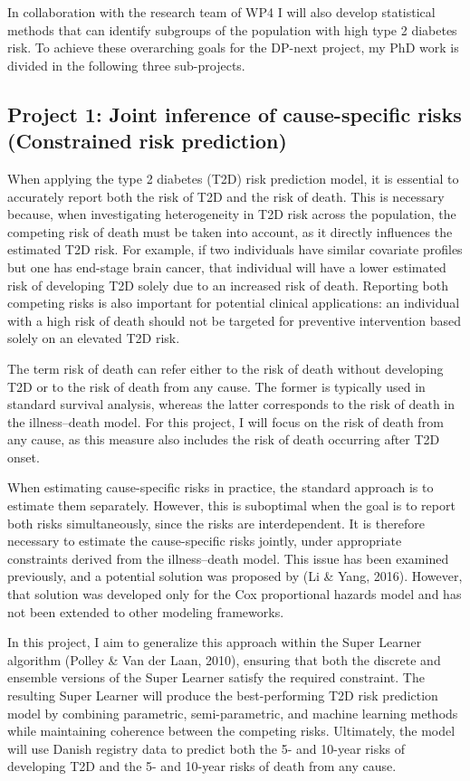 \documentclass{article}
\makeatletter
\newcommand{\citeprocitem}[2]{\hyper@linkstart{cite}{citeproc_bib_item_#1}#2\hyper@linkend}
\makeatother
\begin{document}
In collaboration with the research team of WP4 I will also develop
statistical methods that can identify subgroups of the population with
high type 2 diabetes risk. To achieve these overarching goals for the DP-next
project, my PhD work is divided in the following three sub-projects.


\subsection*{Project 1: Joint inference of cause-specific risks (Constrained risk prediction)}
\label{sec:org53fa25b}
When applying the type 2 diabetes (T2D) risk prediction model, it is essential to accurately report both the risk of T2D and the risk of death. This is necessary because, when investigating heterogeneity in T2D risk across the population, the competing risk of death must be taken into account, as it directly influences the estimated T2D risk. For example, if two individuals have similar covariate profiles but one has end-stage brain cancer, that individual will have a lower estimated risk of developing T2D solely due to an increased risk of death. Reporting both competing risks is also important for potential clinical applications: an individual with a high risk of death should not be targeted for preventive intervention based solely on an elevated T2D risk.

The term risk of death can refer either to the risk of death without developing T2D or to the risk of death from any cause. The former is typically used in standard survival analysis, whereas the latter corresponds to the risk of death in the illness–death model. For this project, I will focus on the risk of death from any cause, as this measure also includes the risk of death occurring after T2D onset.

When estimating cause-specific risks in practice, the standard approach is to estimate them separately. However, this is suboptimal when the goal is to report both risks simultaneously, since the risks are interdependent. It is therefore necessary to estimate the cause-specific risks jointly, under appropriate constraints derived from the illness–death model. This issue has been examined previously, and a potential solution was proposed by (\citeprocitem{4}{Li \& Yang, 2016}). However, that solution was developed only for the Cox proportional hazards model and has not been extended to other modeling frameworks.

In this project, I aim to generalize this approach within the Super Learner algorithm (\citeprocitem{6}{Polley \& Van der Laan, 2010}), ensuring that both the discrete and ensemble versions of the Super Learner satisfy the required constraint. The resulting Super Learner will produce the best-performing T2D risk prediction model by combining parametric, semi-parametric, and machine learning methods while maintaining coherence between the competing risks. Ultimately, the model will use Danish registry data to predict both the 5- and 10-year risks of developing T2D and the 5- and 10-year risks of death from any cause.
\end{document}
